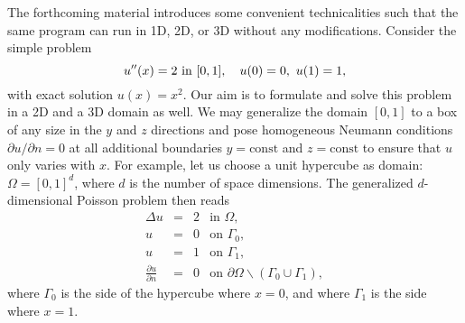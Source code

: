 The forthcoming material introduces some convenient
technicalities such that the same program can run in 1D, 2D, or 3D
without any modifications.
Consider the simple problem
\begin{equation}
u''(x) = 2\hbox{ in }[0,1],\quad u(0)=0,\ u(1)=1,
\end{equation}
with exact solution $u(x)=x^2$. Our aim is to formulate and solve this
problem in a 2D and a 3D domain as well.
We may generalize the domain $[0,1]$ to a box of any size
in the $y$ and $z$ directions and pose homogeneous Neumann
conditions $\partial u/\partial n = 0$ at all additional boundaries
$y=\mbox{const}$ and $z=\mbox{const}$ to ensure that $u$ only varies with
$x$. For example, let us choose
a unit hypercube as domain: $\Omega = [0,1]^d$, where $d$ is the number
of space dimensions. The generalized $d$-dimensional Poisson problem
then reads
\begin{equation} \label{langtangen:poisson1:ddim}
  \begin{array}{rcll}
    \Delta u &=& 2 &\mbox{in } \Omega, \\
    u &=& 0 &\mbox{on } \Gamma_0,\\
    u &=& 1 &\mbox{on } \Gamma_1,\\
\frac{\partial u}{\partial n} &=& 0 &\mbox{on } \partial\Omega\backslash\left(
\Gamma_0\cup\Gamma_1\right),
  \end{array}
\end{equation}
where $\Gamma_0$ is the side of the hypercube where $x=0$, and
where $\Gamma_1$ is the side where $x=1$.

